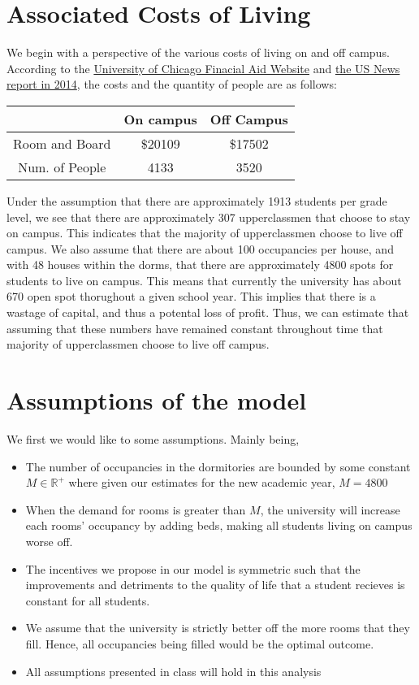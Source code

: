 \documentclass[12pt]{article}
\newcommand{\R}{\mathbb{R}}
\begin{document}
\section{Associated Costs of Living}
We begin with a perspective of the various costs of living on and off campus. According to the \href{https://financialaid.uchicago.edu/undergraduate/how-aid-works/undergraduate-costs/}{University of Chicago Finacial Aid Website} and \href{https://web.archive.org/web/20160304084033/http://colleges.usnews.rankingsandreviews.com/best-colleges/university-of-chicago-1774/student-life}{the US News report in 2014}, the costs and the quantity of people are as follows: 
\begin{table}[H]
    \centering
    \begin{tabular}{c|c|c}
        & On campus & Off Campus\\
        \hline
        Room and Board & \$20109 & \$17502\\ 
        \hline
        Num. of People & 4133 & 3520\\
        \hline
    \end{tabular}
\end{table}
Under the assumption that there are approximately 1913 students per grade level, we see that there are approximately 307 upperclassmen that choose to stay on campus. This indicates that the majority of upperclassmen choose to live off campus. 
We also assume that there are about 100 occupancies per house, and with 48 houses within the dorms, that there are approximately 4800 spots for students to live on campus. This means that currently the university has about 670 open spot thorughout a given school year. This implies that there is a wastage of capital, and thus a potental loss of profit. 
Thus, we can estimate that assuming that these numbers have remained constant throughout time that majority of upperclassmen choose to live off campus. 
\section{Assumptions of the model}
We first we would like to some assumptions. Mainly being,
\begin{itemize}
    \item The number of occupancies in the dormitories are bounded by some constant $M \in \R^+$ where given our estimates for the new academic year, $M = 4800$
    \item When the demand for rooms is greater than $M$, the university will increase each rooms'  occupancy by adding beds, making all students living on campus worse off. 
    \item The incentives we propose in our model is symmetric such that the improvements and detriments to the quality of life that a student recieves is constant for all students.
    \item We assume that the university is strictly better off the more rooms that they fill. Hence,  all occupancies being filled would be the optimal outcome. 
    \item All assumptions presented in class will hold in this analysis
\end{itemize}
\end{document}
